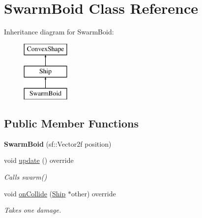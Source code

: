 \hypertarget{class_swarm_boid}{}\section{Swarm\+Boid Class Reference}
\label{class_swarm_boid}
Inheritance diagram for Swarm\+Boid\+:\begin{figure}[H]
\begin{center}
\leavevmode
\includegraphics[height=3.000000cm]{class_swarm_boid}
\end{center}
\end{figure}
\subsection*{Public Member Functions}
\begin{DoxyCompactItemize}
\item 
\hypertarget{class_swarm_boid_afbc06919c94d13561f45f5f9c6f59ca4}{}{\bfseries Swarm\+Boid} (sf\+::\+Vector2f position)\label{class_swarm_boid_afbc06919c94d13561f45f5f9c6f59ca4}

\item 
\hypertarget{class_swarm_boid_a25f68c54ca05b761a6aa700801a02cff}{}void \hyperlink{class_swarm_boid_a25f68c54ca05b761a6aa700801a02cff}{update} () override\label{class_swarm_boid_a25f68c54ca05b761a6aa700801a02cff}

\begin{DoxyCompactList}\small\item\em Calls swarm() \end{DoxyCompactList}\item 
\hypertarget{class_swarm_boid_a8268bb58798e2d22d601c88bcaa27bdf}{}void \hyperlink{class_swarm_boid_a8268bb58798e2d22d601c88bcaa27bdf}{on\+Collide} (\hyperlink{class_ship}{Ship} $\ast$other) override\label{class_swarm_boid_a8268bb58798e2d22d601c88bcaa27bdf}

\begin{DoxyCompactList}\small\item\em Takes one damage. \end{DoxyCompactList}\end{DoxyCompactItemize}
